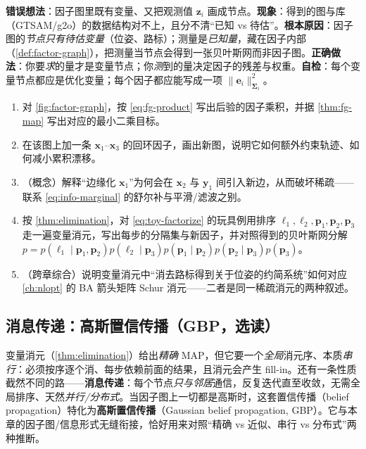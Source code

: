 \begin{pitfall}
\textbf{错误想法}：因子图里既有变量、又把观测值 $\mathbf{z}_i$ 画成节点。\textbf{现象}：得到的图与库（GTSAM/g2o）的数据结构对不上，且分不清“已知 vs 待估”。\textbf{根本原因}：因子图的\emph{节点只有待估变量}（位姿、路标）；测量是\emph{已知量}，藏在因子内部（\cref{def:factor-graph}），把测量当节点会得到一张贝叶斯网而非因子图。\textbf{正确做法}：你要\emph{求}的量才是变量节点；你\emph{测}到的量决定因子的残差与权重。\textbf{自检}：每个变量节点都应是优化变量；每个因子都应能写成一项 $\|\mathbf{e}_i\|_{\boldsymbol{\Sigma}_i}^2$。
\end{pitfall}

\begin{practice}
\begin{enumerate}
  \item 对 \cref{fig:factor-graph}，按 \cref{eq:fg-product} 写出后验的因子乘积，并据 \cref{thm:fg-map} 写出对应的最小二乘目标。
  \item 在该图上加一条 $\mathbf{x}_1$–$\mathbf{x}_3$ 的回环因子，画出新图，说明它如何额外约束轨迹、如何减小累积漂移。
  \item （概念）解释“边缘化 $\mathbf{x}_1$”为何会在 $\mathbf{x}_2$ 与 $\mathbf{y}_1$ 间引入新边，从而破坏稀疏——联系 \cref{eq:info-marginal} 的舒尔补与平滑/滤波之别。
  \item 按 \cref{thm:elimination}，对 \cref{eq:toy-factorize} 的玩具例用排序 $\boldsymbol{\ell}_1,\boldsymbol{\ell}_2,\mathbf{p}_1,\mathbf{p}_2,\mathbf{p}_3$ 走一遍变量消元，写出每步的分隔集与新因子，并对照得到的贝叶斯网分解 $p=p(\boldsymbol{\ell}_1\mid\mathbf{p}_1,\mathbf{p}_2)p(\boldsymbol{\ell}_2\mid\mathbf{p}_3)p(\mathbf{p}_1\mid\mathbf{p}_2)p(\mathbf{p}_2\mid\mathbf{p}_3)p(\mathbf{p}_3)$。
  \item （跨章综合）说明变量消元中“消去路标得到关于位姿的约简系统”如何对应 \cref{ch:nlopt} 的 BA 箭头矩阵 Schur 消元——二者是同一稀疏消元的两种叙述。
\end{enumerate}
\end{practice}

\subsection{消息传递：高斯置信传播（GBP，选读）}
\label{sec:est-gbp}

变量消元（\cref{thm:elimination}）给出\emph{精确} MAP，但它要一个\emph{全局}消元序、本质\emph{串行}：必须按序逐个消、每步依赖前面的结果，且消元会产生 fill-in。还有一条性质截然不同的路——\textbf{消息传递}：每个节点\emph{只与邻居}通信，反复迭代直至收敛，无需全局排序、天然\emph{并行/分布式}。当因子图上一切都是高斯时，这套置信传播（belief propagation）特化为\textbf{高斯置信传播}（Gaussian belief propagation, GBP）\cite{davison2019futuremapping2,ortiz2021gbp}。它与本章的因子图/信息形式无缝衔接，恰好用来对照“精确 vs 近似、串行 vs 分布式”两种推断。

